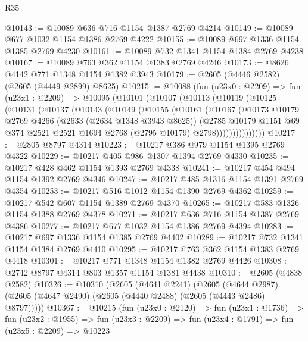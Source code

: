 \begin{lexlean}{R35}
\begin{coremodule}
@10143 := @10089 @636 @716 @1154 @1387 @2769 @4214
@10149 := @10089 @677 @1032 @1154 @1386 @2769 @4222
@10155 := @10089 @697 @1336 @1154 @1385 @2769 @4230
@10161 := @10089 @732 @1341 @1154 @1384 @2769 @4238
@10167 := @10089 @763 @362 @1154 @1383 @2769 @4246
@10173 := @8626 @4142 @771 @1348 @1154 @1382 @3943
@10179 := @2605 (@4446 @2582) (@2605 (@4449 @2899) @8625)
@10215 := @10088
    (fun (u23x0 : @2209) =>
    fun (u23x1 : @2209) =>
    @10095
      (@10101
        (@10107
          (@10113
            (@10119
              (@10125
                (@10131
                  (@10137
                    (@10143
                      (@10149
                        (@10155
                          (@10161
                            (@10167
                              (@10173
                                @10179
                                @2769
                                @4266
                                (@2633 (@2634 @1348 @3943 @8625))
                                (@2785
                                  @10179
                                  @1151
                                  @69
                                  @374
                                  @2521
                                  @2521
                                  @1694
                                  @2768
                                  (@2795 @10179)
                                  @2798)))))))))))))))
@10217 := @2805 @8797 @4314
@10223 := @10217 @386 @979 @1154 @1395 @2769 @4322
@10229 := @10217 @405 @986 @1307 @1394 @2769 @4330
@10235 := @10217 @428 @462 @1154 @1393 @2769 @4338
@10241 := @10217 @454 @494 @1154 @1392 @2769 @4346
@10247 := @10217 @485 @1316 @1154 @1391 @2769 @4354
@10253 := @10217 @516 @1012 @1154 @1390 @2769 @4362
@10259 := @10217 @542 @607 @1154 @1389 @2769 @4370
@10265 := @10217 @583 @1326 @1154 @1388 @2769 @4378
@10271 := @10217 @636 @716 @1154 @1387 @2769 @4386
@10277 := @10217 @677 @1032 @1154 @1386 @2769 @4394
@10283 := @10217 @697 @1336 @1154 @1385 @2769 @4402
@10289 := @10217 @732 @1341 @1154 @1384 @2769 @4410
@10295 := @10217 @763 @362 @1154 @1383 @2769 @4418
@10301 := @10217 @771 @1348 @1154 @1382 @2769 @4426
@10308 := @2742 @8797 @4314 @803 @1357 @1154 @1381 @4438
@10310 := @2605 (@4838 @2582)
@10326 := @10310
    (@2605
      (@4641 @2241)
      (@2605 (@4644 @2987) (@2605 (@4647 @2490) (@2605 (@4440 @2488) (@2605 (@4443 @2486) @8797)))))
@10367 := @10215
    (fun (u23x0 : @2120) =>
    fun (u23x1 : @1736) =>
    fun (u23x2 : @1955) =>
    fun (u23x3 : @2209) =>
    fun (u23x4 : @1791) =>
    fun (u23x5 : @2209) =>
    @10223

\end{coremodule}
\end{lexlean}
